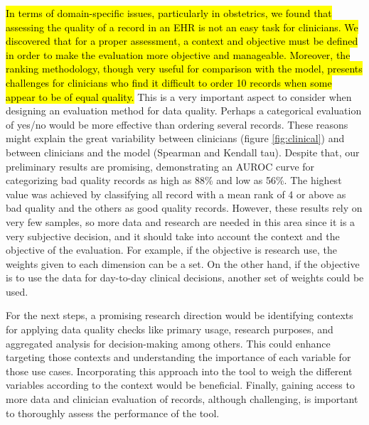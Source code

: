 \hl{In terms of domain-specific issues, particularly in obstetrics, we found that assessing the quality of a record in an EHR is not an easy task for clinicians. We discovered that for a proper assessment, a context and objective must be defined in order to make the evaluation more objective and manageable. Moreover, the ranking methodology, though very useful for comparison with the model, presents challenges for clinicians who find it difficult to order 10 records when some appear to be of equal quality.} This is a very important aspect to consider when designing an evaluation method for data quality. Perhaps a categorical evaluation of yes/no would be more effective than ordering several records. These reasons might explain the great variability between clinicians (figure \ref{fig:clinical}) and between clinicians and the model (Spearman and Kendall tau). Despite that, our preliminary results are promising, demonstrating an AUROC curve for categorizing bad quality records as high as 88\% and low as 56\%. The highest value was achieved by classifying all record with a mean rank of 4 or above as bad quality and the others as good quality records. However, these results rely on very few samples, so more data and research are needed in this area since it is a very subjective decision, and it should take into account the context and the objective of the evaluation. For example, if the objective is research use, the weights given to each dimension can be a set. On the other hand, if the objective is to use the data for day-to-day clinical decisions, another set of weights could be used. 

For the next steps, a promising research direction would be identifying contexts for applying data quality checks like primary usage, research purposes, and aggregated analysis for decision-making among others. This could enhance targeting those contexts and understanding the importance of each variable for those use cases. Incorporating this approach into the tool to weigh the different variables according to the context would be beneficial.  Finally, gaining access to more data and clinician evaluation of records, although challenging, is important to thoroughly assess the performance of the tool.

